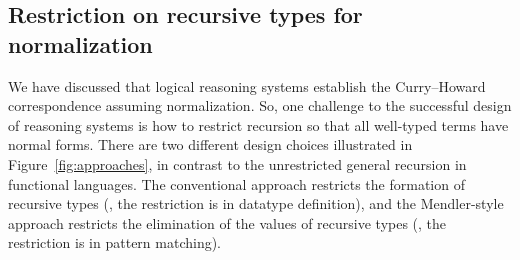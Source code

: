 \subsection{Restriction on recursive types for normalization}
\label{sec:intro:concpets:recursive}
We have discussed that logical reasoning systems establish
the Curry--Howard correspondence assuming normalization.
So, one challenge to the successful design of reasoning systems
is how to restrict recursion so that all well-typed terms have normal forms.
There are two different design choices illustrated
in Figure~\ref{fig:approaches}, in contrast to
the unrestricted general recursion in functional languages.
The conventional approach restricts the formation of recursive types
(\ie, the restriction is in datatype definition), and
the Mendler-style approach restricts the elimination of the values of
recursive types (\ie, the restriction is in pattern matching).





